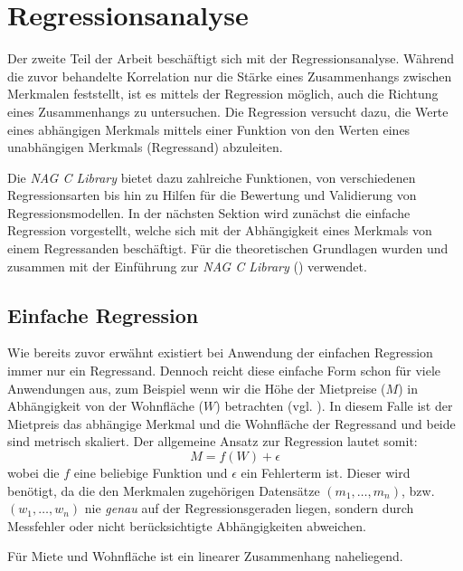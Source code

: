 \section{Regressionsanalyse}

Der zweite Teil der Arbeit beschäftigt sich mit der Regressionsanalyse.
Während die zuvor behandelte Korrelation nur die Stärke eines Zusammenhangs zwischen Merkmalen feststellt, ist es mittels der Regression möglich, auch die Richtung eines Zusammenhangs zu untersuchen.
Die Regression versucht dazu, die Werte eines abhängigen Merkmals mittels einer Funktion von den Werten eines unabhängigen Merkmals (Regressand) abzuleiten.


Die {\it NAG C Library} bietet dazu zahlreiche Funktionen, von verschiedenen Regressionsarten bis hin zu Hilfen für die Bewertung und Validierung von Regressionsmodellen.
In der nächsten Sektion wird zunächst die einfache Regression vorgestellt, welche sich mit der Abhängigkeit eines Merkmals von einem Regressanden beschäftigt.
Für die theoretischen Grundlagen wurden \cite{Cramer2007} und \cite{Fahrmeier2010} zusammen mit der Einführung zur {\it NAG C Library} (\cite{nag:intro}) verwendet.

\subsection{Einfache Regression}

Wie bereits zuvor erwähnt existiert bei Anwendung der einfachen Regression immer nur ein Regressand.
Dennoch reicht diese einfache Form schon für viele Anwendungen aus, zum Beispiel wenn wir die Höhe der Mietpreise ($M$) in Abhängigkeit von der Wohnfläche ($W$) betrachten (vgl. ).
In diesem Falle ist der Mietpreis das abhängige Merkmal und die Wohnfläche der Regressand und beide sind metrisch skaliert.
Der allgemeine Ansatz zur Regression lautet somit:
\begin{equation*}
 M = f(W) + \epsilon
\end{equation*}
wobei die $f$ eine beliebige Funktion und $\epsilon$ ein Fehlerterm ist.
Dieser wird benötigt, da die den Merkmalen zugehörigen Datensätze $(m_1, \dots, m_n)$, bzw. $(w_1, \dots, w_n)$ nie \textit{genau} auf der Regressionsgeraden liegen, sondern durch Messfehler oder nicht berücksichtigte Abhängigkeiten abweichen.

Für Miete und Wohnfläche ist ein linearer Zusammenhang naheliegend.


